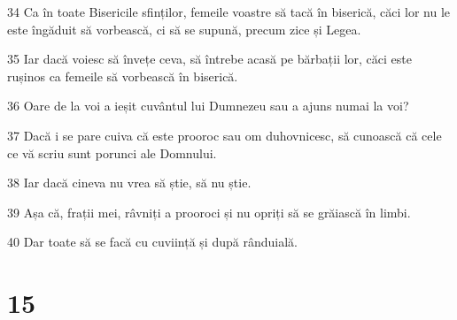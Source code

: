\par 34 Ca în toate Bisericile sfinților, femeile voastre să tacă în biserică, căci lor nu le este îngăduit să vorbească, ci să se supună, precum zice și Legea.
\par 35 Iar dacă voiesc să învețe ceva, să întrebe acasă pe bărbații lor, căci este rușinos ca femeile să vorbească în biserică.
\par 36 Oare de la voi a ieșit cuvântul lui Dumnezeu sau a ajuns numai la voi?
\par 37 Dacă i se pare cuiva că este prooroc sau om duhovnicesc, să cunoască că cele ce vă scriu sunt porunci ale Domnului.
\par 38 Iar dacă cineva nu vrea să știe, să nu știe.
\par 39 Așa că, frații mei, râvniți a prooroci și nu opriți să se grăiască în limbi.
\par 40 Dar toate să se facă cu cuviință și după rânduială.

\chapter{15}

